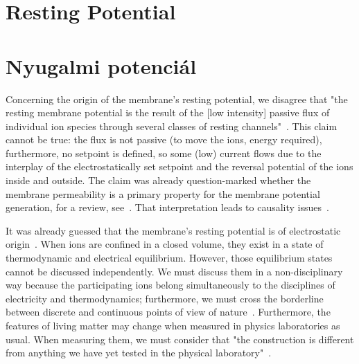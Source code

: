 
\iflatexml
\else
\minitoc
\fi

\ifx\magyar\undefined

\chapter{Resting Potential\label{ch:RestingPotential}}

\else

\chapter{Nyugalmi potenciál\label{ch:RestingPotential}}

\fi

Concerning the origin of the membrane's resting potential, we disagree that "the resting membrane potential is the result of the [low intensity]
passive flux of individual ion species through several
classes of resting channels"~\cite{PrinciplesNeuralScience:2013}.
This claim cannot be true: the flux is not passive
(to move the ions, energy required), furthermore,
no setpoint is defined, so some (low) current flows
due to the interplay of the electrostatically set setpoint
and the reversal potential of the ions inside and outside. 
The claim was already question-marked whether the membrane permeability is a primary property for the 
membrane potential generation, for a review, see~\cite{MembranePotentialPermeability:2024}.
That interpretation leads to causality issues~\cite{HH_Potential_Controversies_2017}. 

It was already guessed that the membrane's resting potential is of electrostatic origin~\cite{MembranePotentialAbsorption:2014,OriginMembranePotential:2018,Hodgkin-HuxleyAdsorption:2021,MembranePotentialPermeability:2024,MembranePotentialKeyFunction:2023}.
When ions are confined in a closed volume,
they exist in a state of thermodynamic and electrical equilibrium.
However, those equilibrium states cannot be discussed independently.
We must discuss them in a non-disciplinary way because the participating ions belong simultaneously to the disciplines of electricity and thermodynamics; furthermore, we must cross the borderline between discrete and continuous points of view 
of nature~\cite{VeghNon-ordinaryLaws:2025}.
Furthermore, the features of living matter may change when measured 
in physics laboratories as usual.
When measuring them, we must consider that "the construction is different from anything we have yet tested in the physical laboratory"~\cite{Schrodinger:1992}.



